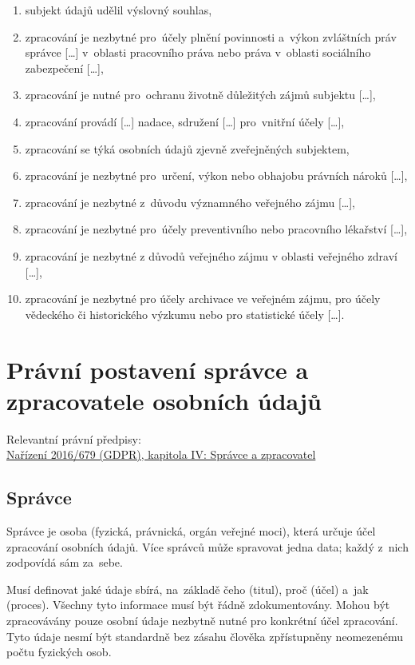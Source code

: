 \begin{enumerate}[label=\alph*)]
\item subjekt údajů udělil výslovný souhlas,
\item zpracování je nezbytné pro~účely plnění povinnosti a~výkon zvláštních práv správce [\dots] v~oblasti pracovního práva nebo práva v~oblasti sociálního zabezpečení [\dots],
\item zpracování je nutné pro~ochranu životně důležitých zájmů subjektu [\dots],
\item zpracování provádí [\dots] nadace, sdružení [\dots] pro~vnitřní účely [\dots],
\item zpracování se týká osobních údajů zjevně zveřejněných subjektem,
\item zpracování je nezbytné pro~určení, výkon nebo obhajobu právních nároků [\dots],
\item zpracování je nezbytné z~důvodu významného veřejného zájmu [\dots],
\item zpracování je nezbytné pro~účely preventivního nebo pracovního lékařství [\dots],
\item zpracování je nezbytné z důvodů veřejného zájmu v oblasti veřejného zdraví [\dots],
\item zpracování je nezbytné pro účely archivace ve veřejném zájmu, pro účely vědeckého či historického výzkumu nebo pro statistické účely [\dots].
\end{enumerate}

\clearpage
\section{Právní postavení správce a zpracovatele osobních údajů}

{}Relevantní právní předpisy:
\\\href{https://eur-lex.europa.eu/legal-content/CS/ALL/?uri=CELEX:32016R0679#d1e3011-1-1
}{Nařízení 2016/679 (GDPR), kapitola IV: Správce a zpracovatel}

\subsection{Správce}

Správce je osoba (fyzická, právnická, orgán veřejné moci), která určuje účel zpracování osobních údajů.
Více správců může spravovat jedna data; každý z~nich zodpovídá sám za~sebe.

Musí definovat jaké údaje sbírá, na~základě čeho (titul), proč (účel) a~jak (proces).
Všechny tyto informace musí být řádně zdokumentovány.
Mohou být zpracovávány pouze osobní údaje nezbytně nutné pro konkrétní účel zpracování.
Tyto údaje nesmí být standardně bez zásahu člověka zpřístupněny neomezenému počtu fyzických osob.

